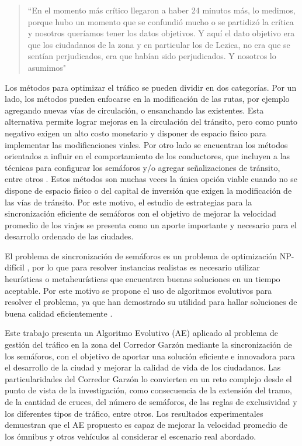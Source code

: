 \begin{quote}\small
	``En el momento más crítico llegaron a haber 24 minutos más, lo medimos, porque hubo un momento que se confundió mucho o se partidizó la crítica y nosotros queríamos tener los datos objetivos. Y aquí el dato objetivo era que los ciudadanos de la zona y en particular los de Lezica, no era que se sentían perjudicados, era que habían sido perjudicados. Y nosotros lo asumimos"
\end{quote}

Los métodos para optimizar el tráfico se pueden dividir en dos categorías. Por un lado, los métodos pueden enfocarse en la modificación de las rutas, por ejemplo agregando nuevas vías de circulación, o ensanchando las existentes. Esta alternativa permite lograr mejoras en la circulación del tránsito, pero como punto negativo exigen un alto costo monetario \citep{litman2009transportation} y disponer de espacio físico para implementar las modificaciones viales. Por otro lado se encuentran los métodos orientados a influir en el comportamiento de los conductores, que incluyen a las técnicas para configurar los semáforos y/o agregar señalizaciones de tránsito, entre otros \citep{mckenney2013distributed}. Estos métodos son muchas veces la única opción viable cuando no se dispone de espacio físico o del capital de inversión que exigen la modificación de las vías de tránsito. Por este motivo, el estudio de estrategias para la sincronización eficiente de semáforos con el objetivo de mejorar la velocidad promedio de los viajes se presenta como un aporte importante y necesario para el desarrollo ordenado de las ciudades. 

El problema de sincronización de semáforos es un problema de optimización NP-difícil \citep{yang1996model}, por lo que para resolver instancias realistas es necesario utilizar heurísticas o metaheurísticas que encuentren buenas soluciones en un tiempo aceptable. Por este motivo se propone el uso de algoritmos evolutivos para resolver el problema, ya que han demostrado su utilidad para hallar soluciones de buena calidad eficientemente \citep{Sanchez2007,Sanchez2010,Rouphail2000,Sanchez2008}.

Este trabajo presenta un Algoritmo Evolutivo (AE) aplicado al problema de gestión del tráfico en la zona del Corredor Garzón mediante la sincronización de los semáforos, con el objetivo de aportar una solución eficiente e innovadora para el desarrollo de la ciudad y mejorar la calidad de vida de los ciudadanos. Las particularidades del Corredor Garzón lo convierten en un reto complejo desde el punto de vista de la investigación, como consecuencia de la extensión del tramo, de la cantidad de cruces, del número de semáforos, de las reglas de exclusividad y los diferentes tipos de tráfico, entre otros. Los resultados experimentales demuestran que el AE propuesto es capaz de mejorar la velocidad promedio de los ómnibus y otros vehículos al considerar el escenario real abordado.


